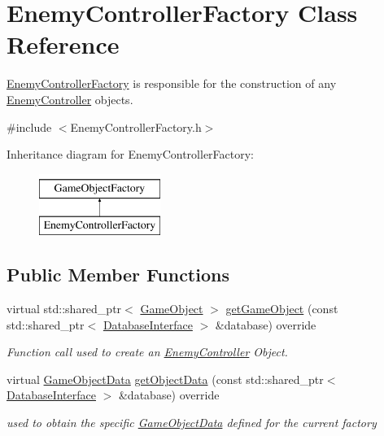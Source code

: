 \hypertarget{class_enemy_controller_factory}{}\section{Enemy\+Controller\+Factory Class Reference}
\label{class_enemy_controller_factory}


\hyperlink{class_enemy_controller_factory}{Enemy\+Controller\+Factory} is responsible for the construction of any \hyperlink{class_enemy_controller}{Enemy\+Controller} objects.  




{\ttfamily \#include $<$Enemy\+Controller\+Factory.\+h$>$}

Inheritance diagram for Enemy\+Controller\+Factory\+:\begin{figure}[H]
\begin{center}
\leavevmode
\includegraphics[height=2.000000cm]{d5/d7d/class_enemy_controller_factory}
\end{center}
\end{figure}
\subsection*{Public Member Functions}
\begin{DoxyCompactItemize}
\item 
virtual std\+::shared\+\_\+ptr$<$ \hyperlink{class_game_object}{Game\+Object} $>$ \hyperlink{class_enemy_controller_factory_a6ab6c433cc498c7353a1ab2eb213664d}{get\+Game\+Object} (const std\+::shared\+\_\+ptr$<$ \hyperlink{class_database_interface}{Database\+Interface} $>$ \&database) override
\begin{DoxyCompactList}\small\item\em Function call used to create an \hyperlink{class_enemy_controller}{Enemy\+Controller} Object. \end{DoxyCompactList}\item 
virtual \hyperlink{struct_game_object_data}{Game\+Object\+Data} \hyperlink{class_enemy_controller_factory_a27d4819c1174490c22f2e111f32ca2ec}{get\+Object\+Data} (const std\+::shared\+\_\+ptr$<$ \hyperlink{class_database_interface}{Database\+Interface} $>$ \&database) override
\begin{DoxyCompactList}\small\item\em used to obtain the specific \hyperlink{struct_game_object_data}{Game\+Object\+Data} defined for the current factory \end{DoxyCompactList}\end{DoxyCompactItemize}


